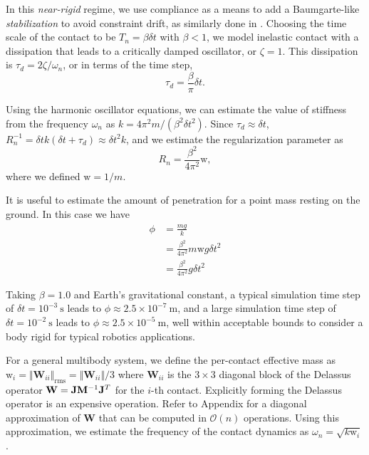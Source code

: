 In this \emph{near-rigid} regime, we use compliance as a means to add a
Baumgarte-like \emph{stabilization} to avoid constraint drift, as similarly
done in \cite{bib:todorov2011}. Choosing the time scale of the contact to be
$T_n = \beta \delta t$ with $\beta < 1$, we model inelastic contact with a dissipation
that leads to a critically damped oscillator, or $\zeta=1$. This dissipation is
$\tau_d=2\zeta/\omega_n$, or in terms of the time step,
\begin{equation}
    \tau_d=\frac{\beta}{\pi}\delta t.
\end{equation}

Using the harmonic oscillator equations, we can estimate the value of stiffness
from the frequency $\omega_n$ as $k=4\pi^2 m/(\beta^2 \delta t^2)$. Since
$\tau_d\approx\delta t$, $R_n^{-1} = \delta t k(\delta t+\tau_d) \approx \delta
t^2k$, and we estimate the regularization parameter as
\begin{equation}
	R_n = \frac{\beta^2}{4\pi^2}\text{w},
\end{equation}
where we defined $\text{w}=1/m$.

It is useful to estimate the amount of penetration for a point mass resting on
the ground. In this case we have
\begin{align*}
	\phi &= \frac{mg}{k} \\
	&= \frac{\beta^2}{4\pi^2}m\text{w}g\delta t^2\\
	&= \frac{\beta^2}{4\pi^2}g\delta t^2
\end{align*}

Taking $\beta=1.0$ and Earth's gravitational constant, a typical simulation
time step of $\delta t=10^{-3}~\text{s}$ leads to $\phi\approx 2.5\times
10^{-7}~\text{m}$, and a large simulation time step of $\delta
t=10^{-2}~\text{s}$ leads to $\phi\approx 2.5\times 10^{-5}~\text{m}$, well
within acceptable bounds to consider a body rigid for typical robotics
applications.

For a general multibody system, we define the per-contact effective mass as
$\text{w}_i=\Vert\mathbf{W}_{ii}\Vert_\text{rms}=\Vert\mathbf{W}_{ii}\Vert/3$ where
$\mathbf{W}_{ii}$ is the $3\times 3$ diagonal block of the Delassus operator
$\mathbf{W}={\mathbf{J}}{\mathbf{M}}^{-1}{\mathbf{J}}^T$ for the $i$-th contact. Explicitly forming the Delassus
operator is an expensive operation. Refer to Appendix \RedHighlight{[O(n)
Approximation of W]} for a diagonal approximation of $\mathbf{W}$ that can be
computed in $\mathcal{O}(n)$ operations. Using this approximation, we estimate the
frequency of the contact dynamics as $\omega_n=\sqrt{k\text{w}_i}$.

